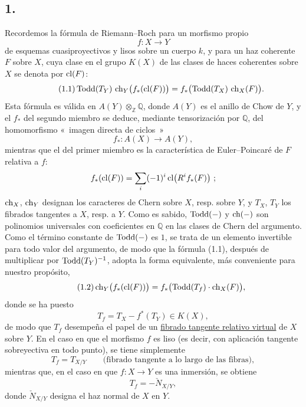 \subsection*{1.}
Recordemos la fórmula de Riemann--Roch para un morfismo propio
\[
f:X\longrightarrow Y
\]
de esquemas cuasiproyectivos y lisos sobre un cuerpo $k$, y para un haz
coherente $F$ sobre $X$, cuya clase en el grupo $K(X)$ de las clases de
haces coherentes sobre $X$ se denota por $\operatorname{cl}(F)$:
\begin{equation}\tag{1.1}
\operatorname{Todd}(T_Y)\,\operatorname{ch}_Y\bigl(f_*(\operatorname{cl}(F))\bigr)=f_*\bigl(\operatorname{Todd}(T_X)\,\operatorname{ch}_X(F)\bigr).
\end{equation}
Esta fórmula es válida en $A(Y)\otimes_{\mathbb Z}\mathbb Q$, donde $A(Y)$
es el anillo de Chow de $Y$, y el $f_*$ del segundo miembro se deduce,
mediante tensorización por $\mathbb Q$, del homomorfismo «~imagen directa de
ciclos~»
\[
f_*:A(X)\longrightarrow A(Y),
\]
mientras que el del primer miembro es la característica de
Euler--Poincaré de $F$ relativa a $f$:
\[
f_*(\operatorname{cl}(F))=\sum_i(-1)^i\operatorname{cl}\bigl(R^if_*(F)\bigr)~;
\]
$\operatorname{ch}_X$, $\operatorname{ch}_Y$ designan los caracteres de Chern sobre $X$, resp. sobre
$Y$, y $T_X$, $T_Y$ los fibrados tangentes a $X$, resp. a $Y$. Como es
sabido, $\operatorname{Todd}(-)$ y $\operatorname{ch}(-)$ son polinomios universales con coeficientes en
$\mathbb Q$ en las clases de Chern del argumento. Como el término constante
de $\operatorname{Todd}(-)$ es $1$, se trata de un elemento invertible para todo valor del
argumento, de modo que la fórmula (1.1), después de multiplicar por
$\operatorname{Todd}(T_Y)^{-1}$, adopta la forma equivalente, más conveniente para nuestro
propósito,
\begin{equation}\tag{1.2}
\operatorname{ch}_Y\bigl(f_*(\operatorname{cl}(F))\bigr)=f_*\bigl(\operatorname{Todd}(T_f)\cdot\operatorname{ch}_X(F)\bigr),
\end{equation}
donde se ha puesto
\begin{equation}\tag{1.3}
T_f=T_X-f^*(T_Y)\in K(X),
\end{equation}
de modo que $T_f$ desempeña el papel de un \underline{fibrado tangente
relativo virtual} de $X$ sobre $Y$. En el caso en que el morfismo $f$ es
liso (es decir, con aplicación tangente sobreyectiva en todo punto), se
tiene simplemente
\[
T_f=T_{X/Y}\qquad\text{(fibrado tangente a lo largo de las fibras)},
\]
mientras que, en el caso en que $f:X\to Y$ es una inmersión, se obtiene
\[
T_f=-\check N_{X/Y},
\]
donde $\check N_{X/Y}$ designa el haz normal de $X$ en $Y$.

